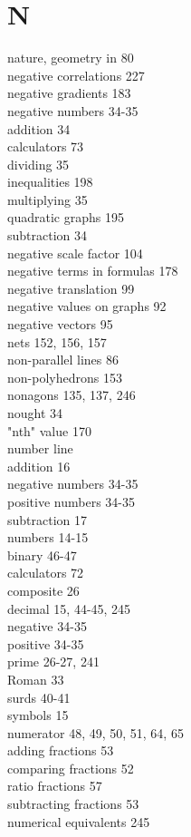 \documentclass[10pt]{article}
\begin{document}
\section*{N}
nature, geometry in 80\\
negative correlations 227\\
negative gradients 183\\
negative numbers 34-35\\
addition 34\\
calculators 73\\
dividing 35\\
inequalities 198\\
multiplying 35\\
quadratic graphs 195\\
subtraction 34\\
negative scale factor 104\\
negative terms in formulas 178\\
negative translation 99\\
negative values on graphs 92\\
negative vectors 95\\
nets 152, 156, 157\\
non-parallel lines 86\\
non-polyhedrons 153\\
nonagons 135, 137, 246\\
nought 34\\
"nth" value 170\\
number line\\
addition 16\\
negative numbers 34-35\\
positive numbers 34-35\\
subtraction 17\\
numbers 14-15\\
binary 46-47\\
calculators 72\\
composite 26\\
decimal 15, 44-45, 245\\
negative 34-35\\
positive 34-35\\
prime 26-27, 241\\
Roman 33\\
surds 40-41\\
symbols 15\\
numerator 48, 49, 50, 51, 64, 65\\
adding fractions 53\\
comparing fractions 52\\
ratio fractions 57\\
subtracting fractions 53\\
numerical equivalents 245
\end{document}

